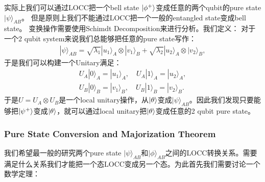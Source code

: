 \bigskip
{}

实际上我们可以通过LOCC把一个bell state $ \left| \phi^+ \right\rangle $变成任意的两个qubit的pure state $
|\psi\rangle_{AB} $。
但是原则上我们不能通过LOCC把一个一般的entangled state变成bell state。
变换操作需要使用Schimdt Decomposition来进行分析。我们定义：
对于一个2 qubit system来说我们总能够把任意的pure state写作：
\begin{align}
  |\psi\rangle_{AB} = \sqrt{\lambda_1} |u_1\rangle_A \otimes
  |v_1\rangle_B + \sqrt{\lambda_2} |u_2\rangle_A \otimes |v_2\rangle_B,
\end{align}
于是我们可以构建一个Unitary满足：
\begin{align}
  U_A |0\rangle_A = |u_1\rangle_A, \quad U_A |1\rangle_A = |u_2\rangle_A, \\
  U_B |0\rangle_B = |v_1\rangle_B, \quad U_B |1\rangle_B = |v_2\rangle_B.
\end{align}
于是$  U = U_A \otimes U_B  $是一个local unitary操作，从$ \left| \theta \right\rangle $变成$
|\psi\rangle_{AB} $。因此我们发现只要能够把$ \left| \psi^+ \right\rangle $变成$ \left| \theta \right\rangle
$，就可以通过local unitary把$ \left| \theta \right\rangle $变成任意的2 qubit pure state。

\subsubsection{Pure State Conversion and Majorization Theorem}

我们希望最一般的研究两个pure state $ |\psi\rangle_{AB} $和$ |\phi\rangle_{AB}
$之间的LOCC转换关系。需要满足什么关系我们才能把一个态LOCC变成另一个态。为此首先我们需要讨论一个数学定理：

\bigskip
{}

